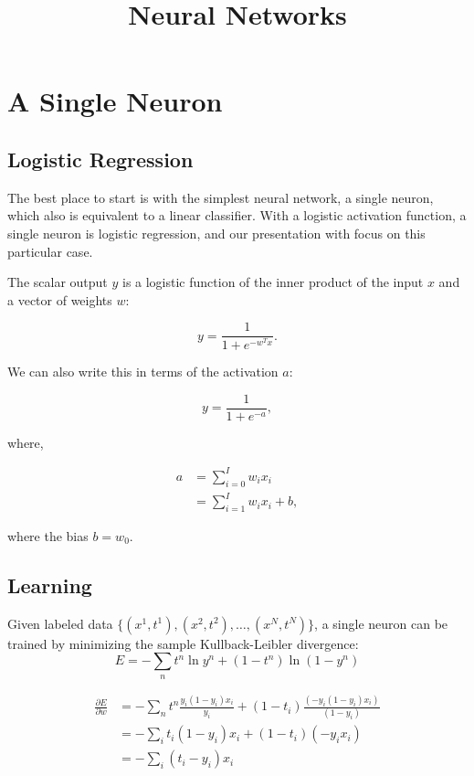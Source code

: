 \documentclass{article}
\begin{document}
\title{Neural Networks}
\author{}
\date{}
\maketitle

\section{A Single Neuron}

\subsection{Logistic Regression}

The best place to start is with the simplest neural network, a single neuron, which also is equivalent to a linear classifier.  With a logistic activation function, a single neuron is logistic regression, and our presentation with focus on this particular case.

The scalar output $y$ is a logistic function of the inner product of the input $x$ and a vector of weights $w$:

\begin{equation}
y = \frac{1}{1 + e^{-w^T x}}.
\end{equation}

We can also write this in terms of the activation $a$:

\begin{equation}
y = \frac{1}{1 + e^{-a}},
\end{equation}

where,

\begin{align}
a &= \sum_{i = 0}^I w_i x_i \\
&= \sum_{i = 1}^I w_i x_i + b,
\end{align}

where the bias $b = w_0$.

\subsection{Learning}

Given labeled data $\{(x^1, t^1), (x^2, t^2), \ldots, (x^N, t^N)\}$, a single neuron can be trained by minimizing the sample Kullback-Leibler divergence:
\begin{equation}
E = - \sum_n t^n \ln y^n + (1 - t^n) \ln (1 - y^n) 
\end{equation}

\begin{align}
\frac{\partial E}{\partial w} &= - \sum_n t^n \frac{y_i (1 - y_i) x_i}{y_i} + (1 - t_i) \frac{(-y_i (1 - y_i) x_i)}{ (1 - y_i)} \\
&= - \sum_i t_i (1 - y_i) x_i + (1 - t_i) (-y_i x_i) \\
&= - \sum_i (t_i - y_i) x_i
\end{align}
\end{document}
